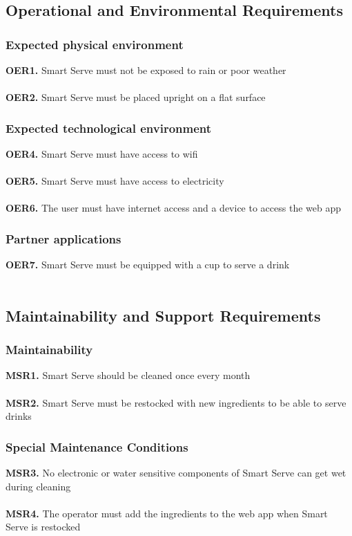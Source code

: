 \documentclass{article}
\begin{document}
\subsection{Operational and Environmental Requirements}
    \subsubsection{Expected physical environment}
        \noindent\textbf{OER1.} Smart Serve must not be exposed to rain or poor weather \\\\
        \textbf{OER2.} Smart Serve must be placed upright on a flat surface \\
    \subsubsection{Expected technological environment}
        \noindent\textbf{OER4.} Smart Serve must have access to wifi \\\\
        \textbf{OER5.} Smart Serve must have access to electricity \\\\
        \textbf{OER6.} The user must have internet access and a device to access the web app \\
    \subsubsection{Partner applications}
        \noindent\textbf{OER7.} Smart Serve must be equipped with a cup to serve a drink \\\\

\subsection{Maintainability and Support Requirements}
    \subsubsection{Maintainability}
        \noindent\textbf{MSR1.} Smart Serve should be cleaned once every month \\\\
        \textbf{MSR2.} Smart Serve must be restocked with new ingredients to be able to serve drinks \\
    \subsubsection{Special Maintenance Conditions} 
        \noindent\textbf{MSR3.} No electronic or water sensitive components of Smart Serve can get wet during cleaning \\\\
        \textbf{MSR4.} The operator must add the ingredients to the web app when Smart Serve is restocked \\
\end{document}
